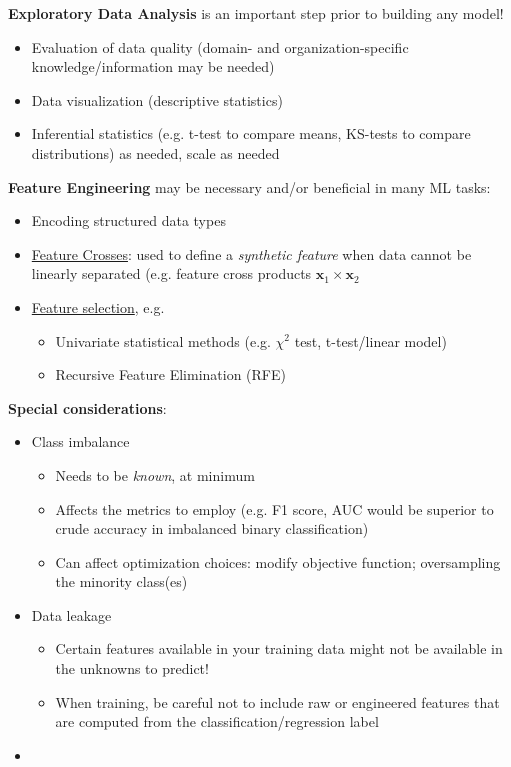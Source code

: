 \documentclass[10pt,landscape,letterpaper]{cheatsheet}
\begin{document}
\begin{multicols}{3}
\textbf{Exploratory Data Analysis} is an important step prior to building any model!

\begin{itemize}
    \item Evaluation of data quality (domain- and organization-specific knowledge/information may be needed)
    \item Data visualization (descriptive statistics)
    \item Inferential statistics (e.g. t-test to compare means, KS-tests to compare distributions) as needed, scale as needed
\end{itemize}

\textbf{Feature Engineering} may be necessary and/or beneficial in many ML tasks:

\begin{itemize}
    \item Encoding structured data types
    \item \href{https://developers.google.com/machine-learning/crash-course/feature-crosses/video-lecture}{Feature Crosses}: used to define a \emph{synthetic feature} when data cannot be linearly separated (e.g. feature cross products $\mathbf{x}_1 \times \mathbf{x}_2$
    \item \href{https://scikit-learn.org/stable/modules/feature_selection.html}{Feature selection}, e.g.
    \begin{itemize}
        \item Univariate statistical methods (e.g. $\chi^2$ test, t-test/linear model)
        \item Recursive Feature Elimination (RFE)
    \end{itemize}
\end{itemize}

\textbf{Special considerations}:

\begin{itemize}
    \item Class imbalance
    \begin{itemize}
        \item Needs to be \emph{known}, at minimum
        \item Affects the metrics to employ (e.g. F1 score, AUC would be superior to crude accuracy in imbalanced binary classification)
        \item Can affect optimization choices: modify objective function; oversampling the minority class(es)
    \end{itemize}
    \item Data leakage
    \begin{itemize}
        \item Certain features available in your training data might not be available in the unknowns to predict!
        \item When training, be careful not to include raw or engineered features that are computed from the classification/regression label
    \end{itemize}
    \item 
\end{itemize}


\end{multicols}
\end{document}

